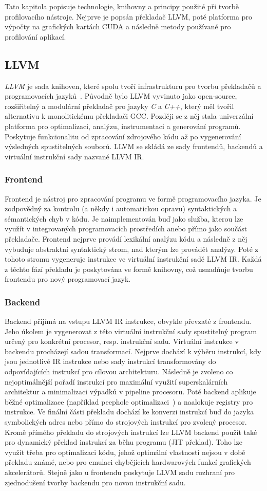 Tato kapitola popisuje technologie, knihovny a principy použité při tvorbě profilovacího nástroje. Nejprve je popsán překladač LLVM, poté platforma pro výpočty na grafických kartách CUDA a následně metody používané pro profilování aplikací.

\subsection{LLVM}
\emph{LLVM} je sada knihoven, které spolu tvoří infrastrukturu pro tvorbu překladačů a programovacích jazyků~\cite{llvm}. Původně bylo LLVM vyvinuto jako open-source, rozšiřitelný a modulární překladač pro jazyky \emph{C} a \emph{C++}, který měl tvořil alternativu k monolitickému překladači GCC. Později se z něj stala univerzální platforma pro optimalizaci, analýzu, instrumentaci a generování programů. Poskytuje funkcionalitu od zpracování zdrojového kódu až po vygenerování výsledných spustitelných souborů. LLVM se skládá ze sady frontendů, backendů a virtuální instrukční sady nazvané LLVM IR.
\subsubsection*{Frontend}
Frontend je nástroj pro zpracování programu ve formě programovacího jazyka. Je zodpovědný za kontrolu (a někdy i automatickou opravu) syntaktických a sémantických chyb v kódu. Je naimplementován buď jako služba, kterou lze využít v integrovaných programovacích prostředích anebo přímo jako součást překladače. Frontend nejprve provádí lexikální analýzu kódu a následně z něj vybuduje abstraktní syntaktický strom, nad kterým lze provádět analýzy. Poté z tohoto stromu vygeneruje instrukce ve virtuální instrukční sadě LLVM IR. Každá z těchto fází překladu je poskytována ve formě knihovny, což usnadňuje tvorbu frontendu pro nový programovací jazyk.
\subsubsection*{Backend}
Backend přijímá na vstupu LLVM IR instrukce, obvykle převzaté z frontendu. Jeho úkolem je vygenerovat z této virtuální instrukční sady spustitelný program určený pro konkrétní procesor, resp. instrukční sadu. Virtuální instrukce v backendu procházejí sadou transformací. Nejprve dochází k výběru instrukcí, kdy jsou jednotlivé IR instrukce nebo sady instrukcí transformovány do odpovídajících instrukcí pro cílovou architekturu. Následně je zvoleno co nejoptimálnější pořadí instrukcí pro maximální využití superskalárních architektur a minimalizaci výpadků v pipeline procesoru. Poté backend aplikuje běžné optimalizace (například peephole optimalizaci~\cite{peephole}) a naalokuje registry pro instrukce. Ve finální části překladu dochází ke konverzi instrukcí buď do jazyka symbolických adres nebo přímo do strojových instrukcí pro zvolený procesor. Kromě přímého překladu do strojových instrukcí lze LLVM backend použít také pro dynamický překlad instrukcí za běhu programu (JIT překlad). Toho lze využít třeba pro optimalizaci kódu, jehož optimální vlastnosti nejsou v době překladu známé, nebo pro emulaci chybějících hardwarových funkcí grafických akcelerátorů. Stejně jako u frontendu poskytuje LLVM sadu rozhraní pro zjednodušení tvorby backendu pro novou instrukční sadu.
